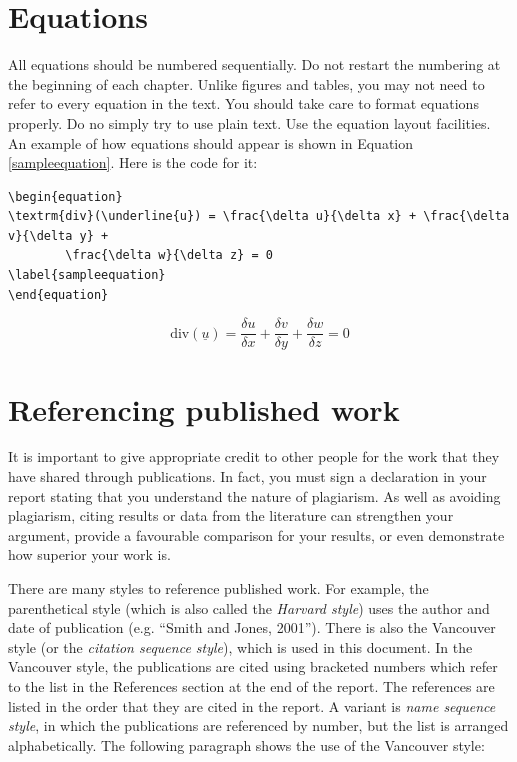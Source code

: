 \section{Equations}
All equations should be numbered sequentially. Do not restart the numbering at the beginning of each chapter. Unlike figures and tables, you may not need to refer to every equation in the text. You should take care to format equations properly. Do no simply try to use plain text. Use the equation layout facilities. An example of how equations should appear is shown in Equation \ref{sampleequation}. Here is the code for it:

{\footnotesize
\begin{verbatim}
\begin{equation}
\textrm{div}(\underline{u}) = \frac{\delta u}{\delta x} + \frac{\delta v}{\delta y} +
        \frac{\delta w}{\delta z} = 0
\label{sampleequation}
\end{equation} 
\end{verbatim}
}

\begin{equation}
\textrm{div}(\underline{u}) = \frac{\delta u}{\delta x} + \frac{\delta v}{\delta y} + \frac{\delta w}{\delta z} = 0
\label{sampleequation}
\end{equation} 

\section{Referencing published work}
It is important to give appropriate credit to other people for the work that they have shared through publications. In fact, you must sign a declaration in your report stating that you understand the nature of plagiarism. As well as avoiding plagiarism, citing results or data from the literature can strengthen your argument, provide a favourable comparison for your results, or even demonstrate how superior your work is.

There are many styles to reference published work. For example, the parenthetical style (which is also called the \emph{Harvard style}) uses the author and date of publication (e.g. ``Smith and Jones, 2001''). There is also the Vancouver style (or the \emph{citation sequence style}), which is used in this document. In the Vancouver style, the publications are cited using bracketed numbers which refer to the list in the References section at the end of the report. The references are listed in the order that they are cited in the report. A variant is \emph{name sequence style}, in which the publications are referenced by number, but the list is arranged alphabetically. The following paragraph shows the use of the Vancouver style: 

